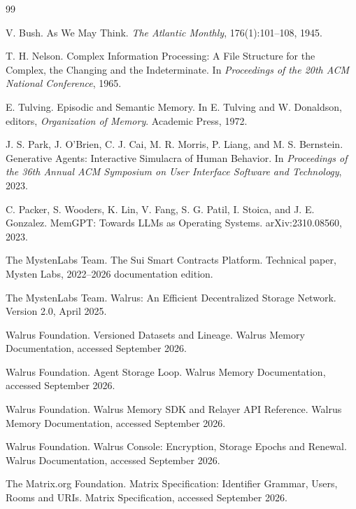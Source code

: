 \documentclass[11pt]{article}
\begin{document}
\begin{thebibliography}{99}

V. Bush.
\newblock As We May Think.
\newblock \emph{The Atlantic Monthly}, 176(1):101--108, 1945.

T. H. Nelson.
\newblock Complex Information Processing: A File Structure for the Complex, the Changing and the Indeterminate.
\newblock In \emph{Proceedings of the 20th ACM National Conference}, 1965.

E. Tulving.
\newblock Episodic and Semantic Memory.
\newblock In E. Tulving and W. Donaldson, editors, \emph{Organization of Memory}. Academic Press, 1972.

J. S. Park, J. O'Brien, C. J. Cai, M. R. Morris, P. Liang, and M. S. Bernstein.
\newblock Generative Agents: Interactive Simulacra of Human Behavior.
\newblock In \emph{Proceedings of the 36th Annual ACM Symposium on User Interface Software and Technology}, 2023.

C. Packer, S. Wooders, K. Lin, V. Fang, S. G. Patil, I. Stoica, and J. E. Gonzalez.
\newblock MemGPT: Towards LLMs as Operating Systems.
\newblock arXiv:2310.08560, 2023.

The MystenLabs Team.
\newblock The Sui Smart Contracts Platform.
\newblock Technical paper, Mysten Labs, 2022--2026 documentation edition.

The MystenLabs Team.
\newblock Walrus: An Efficient Decentralized Storage Network.
\newblock Version 2.0, April 2025.

Walrus Foundation.
\newblock Versioned Datasets and Lineage.
\newblock Walrus Memory Documentation, accessed September 2026.

Walrus Foundation.
\newblock Agent Storage Loop.
\newblock Walrus Memory Documentation, accessed September 2026.

Walrus Foundation.
\newblock Walrus Memory SDK and Relayer API Reference.
\newblock Walrus Memory Documentation, accessed September 2026.

Walrus Foundation.
\newblock Walrus Console: Encryption, Storage Epochs and Renewal.
\newblock Walrus Documentation, accessed September 2026.

The Matrix.org Foundation.
\newblock Matrix Specification: Identifier Grammar, Users, Rooms and URIs.
\newblock Matrix Specification, accessed September 2026.

\end{thebibliography}
\end{document}
